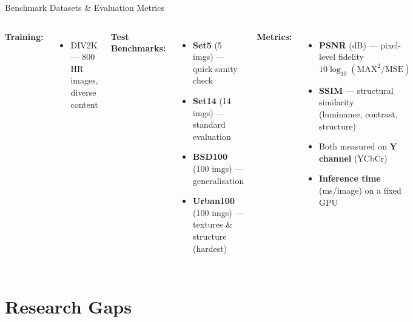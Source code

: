 \documentclass[aspectratio=169]{beamer}
\begin{document}
\begin{frame}{Benchmark Datasets \& Evaluation Metrics}
  \begin{columns}
      \textbf{Training:}
      \begin{itemize}
        \item DIV2K — 800 HR images, diverse content
      \end{itemize}
      \vspace{6pt}
      \textbf{Test Benchmarks:}
      \begin{itemize}
        \item \textbf{Set5} (5 imgs) — quick sanity check
        \item \textbf{Set14} (14 imgs) — standard evaluation
        \item \textbf{BSD100} (100 imgs) — generalisation
        \item \textbf{Urban100} (100 imgs) — textures \& structure (hardest)
      \end{itemize}
      \textbf{Metrics:}
      \begin{itemize}
        \item \textbf{PSNR} (dB) — pixel-level fidelity\\
              $10\log_{10}(\text{MAX}^2/\text{MSE})$
        \item \textbf{SSIM} — structural similarity\\
              (luminance, contrast, structure)
        \item Both measured on \textbf{Y channel} (YCbCr)
        \item \textbf{Inference time} (ms/image) on a fixed GPU
      \end{itemize}
  \end{columns}
\end{frame}

\section{Research Gaps}
\end{document}
